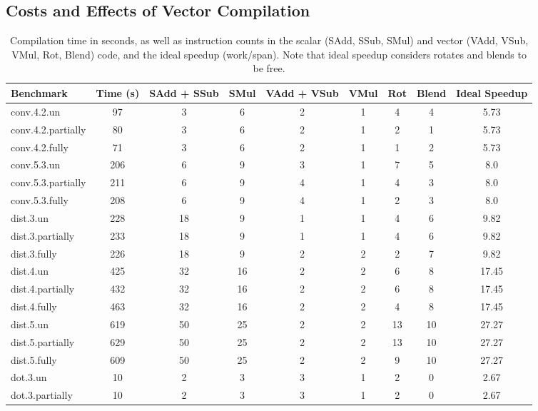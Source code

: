 \subsection{Costs and Effects of Vector Compilation}\label{sec:compilation-stuff}

\begin{table}
	\small
	\centering
    \caption{Compilation time in seconds, as well as instruction counts in the scalar (SAdd, SSub, SMul) and vector (VAdd, VSub, VMul, Rot, Blend) code, and the ideal speedup (work/span). Note that ideal speedup considers rotates and blends to be free.}\label{tab:big-ass}
    \vspace{-0.5em}
    \begin{tabular}{lcccccccc}
    \toprule
    Benchmark & Time (s) & SAdd + SSub & SMul & VAdd + VSub & VMul & Rot & Blend & Ideal Speedup\\\midrule
    conv.4.2.un & 97 & 3 & 6 & 2 & 1 & 4 & 4 & 5.73\\
    conv.4.2.partially & 80 & 3 & 6 & 2 & 1 & 2 & 1 & 5.73\\
    conv.4.2.fully & 71 & 3 & 6 & 2 & 1 & 1 & 2 & 5.73\\
    \midrule
    conv.5.3.un & 206 & 6 & 9 & 3 & 1 & 7 & 5 & 8.0\\
    conv.5.3.partially & 211 & 6 & 9 & 4 & 1 & 4 & 3 & 8.0\\
    conv.5.3.fully & 208 & 6 & 9 & 4 & 1 & 2 & 3 & 8.0\\
    \midrule
    dist.3.un & 228 & 18 & 9 & 1 & 1 & 4 & 6 & 9.82\\
    dist.3.partially & 233 & 18 & 9 & 1 & 1 & 4 & 6 & 9.82\\
    dist.3.fully & 226 & 18 & 9 & 2 & 2 & 2 & 7 & 9.82\\
    \midrule
    dist.4.un & 425 & 32 & 16 & 2 & 2 & 6 & 8 & 17.45\\
    dist.4.partially & 432 & 32 & 16 & 2 & 2 & 6 & 8 & 17.45\\
    dist.4.fully & 463 & 32 & 16 & 2 & 2 & 4 & 8 & 17.45\\
    \midrule
    dist.5.un & 619 & 50 & 25 & 2 & 2 & 13 & 10 & 27.27\\
    dist.5.partially & 629 & 50 & 25 & 2 & 2 & 13 & 10 & 27.27\\
    dist.5.fully & 609 & 50 & 25 & 2 & 2 & 9 & 10 & 27.27\\
    \midrule
    dot.3.un & 10 & 2 & 3 & 3 & 1 & 2 & 0 & 2.67\\
    dot.3.partially & 10 & 2 & 3 & 3 & 1 & 2 & 0 & 2.67\\

\end{tabular}
\end{table}
